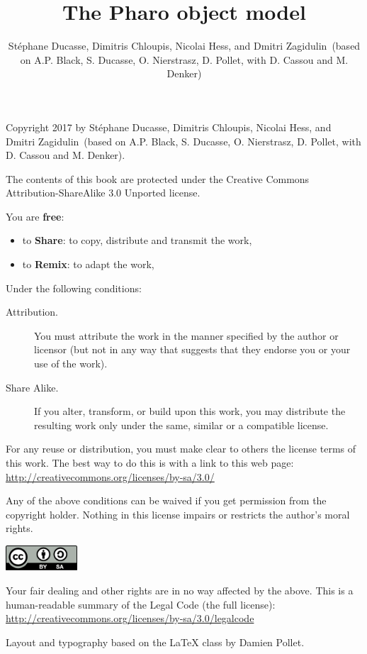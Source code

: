 \documentclass[10pt,twoside,english]{_support/latex/sbabook/sbabook}
\title{The Pharo object model}
\author{Stéphane Ducasse, Dimitris Chloupis, Nicolai Hess, and Dmitri Zagidulin\ (based on A.P. Black, S. Ducasse, O. Nierstrasz, D. Pollet, with D. Cassou and M. Denker)}
\begin{document}
\maketitle
\pagestyle{titlingpage}
\thispagestyle{titlingpage} %

\cleartoverso
{\small

  Copyright 2017 by Stéphane Ducasse, Dimitris Chloupis, Nicolai Hess, and Dmitri Zagidulin\ (based on A.P. Black, S. Ducasse, O. Nierstrasz, D. Pollet, with D. Cassou and M. Denker).

  The contents of this book are protected under the Creative Commons
  Attribution-ShareAlike 3.0 Unported license.

  You are \textbf{free}:
  \begin{itemize}
  \item to \textbf{Share}: to copy, distribute and transmit the work,
  \item to \textbf{Remix}: to adapt the work,
  \end{itemize}

  Under the following conditions:
  \begin{description}
  \item[Attribution.] You must attribute the work in the manner specified by the
    author or licensor (but not in any way that suggests that they endorse you
    or your use of the work).
  \item[Share Alike.] If you alter, transform, or build upon this work, you may
    distribute the resulting work only under the same, similar or a compatible
    license.
  \end{description}

  For any reuse or distribution, you must make clear to others the
  license terms of this work. The best way to do this is with a link to
  this web page: \\
  \url{http://creativecommons.org/licenses/by-sa/3.0/}

  Any of the above conditions can be waived if you get permission from
  the copyright holder. Nothing in this license impairs or restricts the
  author's moral rights.

  \begin{center}
    \includegraphics[width=0.2\textwidth]{_support/latex/sbabook/CreativeCommons-BY-SA.pdf}
  \end{center}

  Your fair dealing and other rights are in no way affected by the
  above. This is a human-readable summary of the Legal Code (the full
  license): \\
  \url{http://creativecommons.org/licenses/by-sa/3.0/legalcode}

  \vfill

  Layout and typography based on the  \LaTeX{} class by Damien
  Pollet.
}
\end{document}
